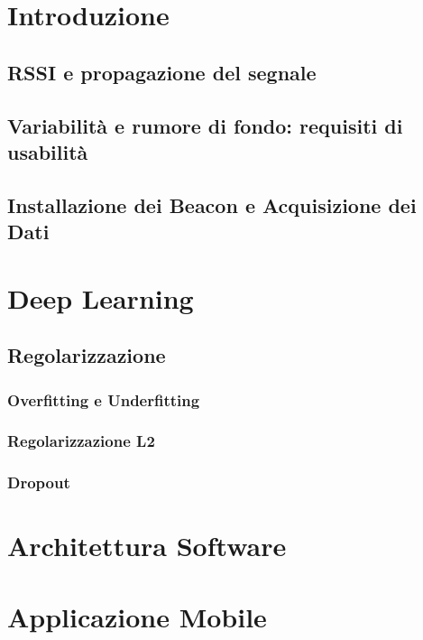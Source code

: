 \documentclass[12pt]{report}
\begin{document}
\begin{abstract}
  
\end{abstract}

\tableofcontents

\chapter{Introduzione}

\section{RSSI e propagazione del segnale}
\section{Variabilità e rumore di fondo: requisiti di usabilità}
\section{Installazione dei Beacon e Acquisizione dei Dati}

\chapter{Deep Learning}


\section{Regolarizzazione}
\subsection{Overfitting e Underfitting}
\subsection{Regolarizzazione L2}
\subsection{Dropout}

\chapter{Architettura Software}


\chapter{Applicazione Mobile}
\end{document}
